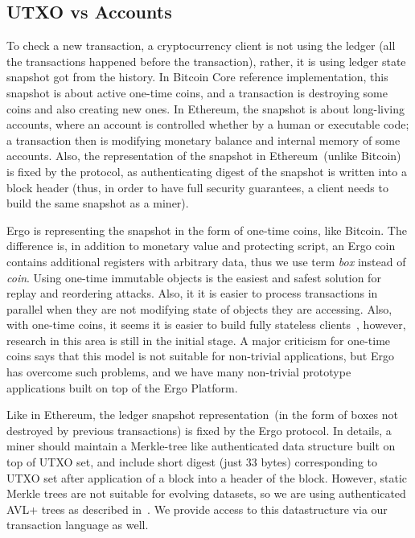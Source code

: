 
\subsection{UTXO vs Accounts}
 \label{sec:utxo}


 To check a new transaction, a cryptocurrency client is not using the ledger (all the transactions happened before the
 transaction), rather, it is using ledger state snapshot got from the history. In Bitcoin Core reference implementation,
 this snapshot is about active one-time coins, and a transaction is destroying some coins and also creating new ones.
 In Ethereum, the snapshot is about long-living accounts, where an account is controlled whether by a human or
 executable code; a transaction then is modifying monetary balance and internal memory of some accounts. Also, the
 representation of the snapshot in Ethereum~(unlike Bitcoin) is fixed by the protocol, as authenticating digest of the
 snapshot is written into a block header (thus, in order to have full security guarantees, a client needs to build
 the same snapshot as a miner).

 Ergo is representing the snapshot in the form of one-time coins, like Bitcoin. The difference is, in addition to monetary
 value and protecting script, an Ergo coin contains additional registers with arbitrary data, thus we use term {\em box}
 instead of {\em coin}. Using one-time immutable objects is the easiest and safest solution for replay and reordering
 attacks. Also, it it is easier to process transactions in parallel when they are not modifying state of objects they
 are accessing. Also, with one-time coins, it seems it is easier to build fully stateless clients~\cite{chepurnoy2018edrax},
 however, research in this area is still in the initial stage. A major criticism for one-time coins says that this model
 is not suitable for non-trivial applications, but Ergo has overcome such problems, and we have many non-trivial
 prototype applications built on top of the Ergo Platform.

 Like in Ethereum, the ledger snapshot representation~(in the form of boxes not destroyed by
 previous transactions) is fixed by the Ergo protocol. In details, a miner should maintain a Merkle-tree like
 authenticated data structure built on top of UTXO set, and include short digest (just 33 bytes) corresponding to UTXO
 set after application of a block into a header of the block. However, static Merkle trees are not suitable for evolving
 datasets, so we are using authenticated AVL+ trees as described in~\cite{reyzin2017improving}. We provide access to
 this datastructure via our transaction language as well.


